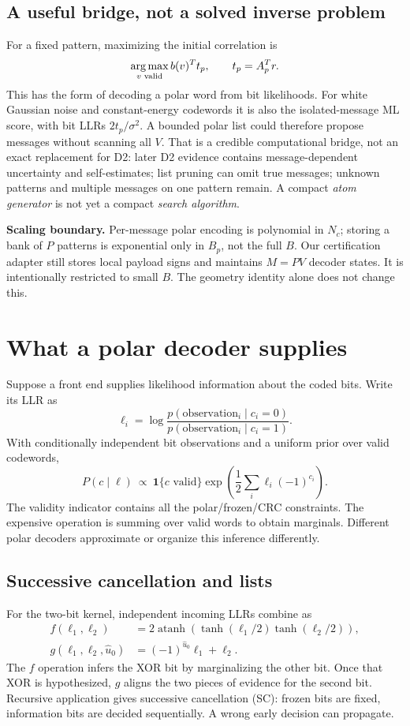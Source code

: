 \documentclass[10pt,a4paper]{article}
\begin{document}
\subsection{A useful bridge, not a solved inverse problem}
For a fixed pattern, maximizing the initial correlation is
\begin{equation}
 \operatorname*{arg\,max}_{v\text{ valid}} b(v)^T t_p,\qquad t_p=A_p^T r.
\end{equation}
This has the form of decoding a polar word from bit likelihoods. For white Gaussian noise and constant-energy
codewords it is also the isolated-message ML score, with bit LLRs $2t_p/\sigma^2$.
A bounded polar list could therefore propose messages without scanning all $V$.
That is a credible computational bridge, not an exact replacement for D2: later D2 evidence contains
message-dependent uncertainty and self-estimates; list pruning can omit true messages; unknown patterns and
multiple messages on one pattern remain. A compact \emph{atom generator} is not yet a compact \emph{search algorithm}.

\textbf{Scaling boundary.} Per-message polar encoding is polynomial in $N_c$; storing a bank of $P$ patterns is
exponential only in $B_p$, not the full $B$. Our certification adapter still stores local payload signs and maintains
$M=PV$ decoder states. It is intentionally restricted to small $B$. The geometry identity alone does not change this.

\clearpage
\section{What a polar decoder supplies}
Suppose a front end supplies likelihood information about the coded bits. Write its LLR as
\[
\ell_i=\log\frac{p(\text{observation}_i\mid c_i=0)}{p(\text{observation}_i\mid c_i=1)}.
\]
With conditionally independent bit observations and a uniform prior over valid codewords,
\begin{equation}
 P(c\mid\ell)\ \propto\ \mathbf1\{c\text{ valid}\}
 \exp\!\left(\frac12\sum_i\ell_i(-1)^{c_i}\right).
 \label{eq:polarpost}
\end{equation}
The validity indicator contains all the polar/frozen/CRC constraints. The expensive operation is summing over valid
words to obtain marginals. Different polar decoders approximate or organize this inference differently.

\subsection{Successive cancellation and lists}
For the two-bit kernel, independent incoming LLRs combine as
\begin{align}
 f(\ell_1,\ell_2)&=2\operatorname{atanh}\!\left(\tanh(\ell_1/2)\tanh(\ell_2/2)\right),\\
 g(\ell_1,\ell_2,\widehat u_0)&=(-1)^{\widehat u_0}\ell_1+\ell_2.
\end{align}
The $f$ operation infers the XOR bit by marginalizing the other bit. Once that XOR is hypothesized, $g$ aligns
the two pieces of evidence for the second bit. Recursive application gives successive cancellation (SC): frozen
bits are fixed, information bits are decided sequentially. A wrong early decision can propagate.
\end{document}

